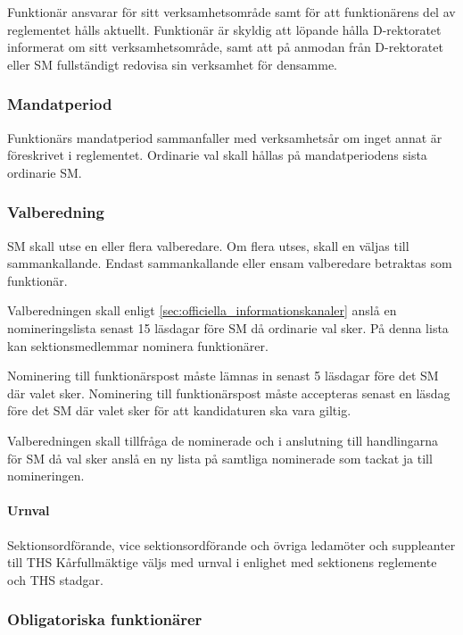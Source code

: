 \documentclass{dgovdoc}
\begin{document}
Funktionär ansvarar för sitt verksamhetsområde samt för att funktionärens del
av reglementet hålls aktuellt. Funktionär är skyldig att löpande hålla
D-rektoratet informerat om sitt verksamhetsområde, samt att på anmodan från
D-rektoratet eller SM fullständigt redovisa sin verksamhet för densamme.

\subsubsection{Mandatperiod}

Funktionärs mandatperiod sammanfaller med verksamhetsår om inget annat är
föreskrivet i reglementet. Ordinarie val skall hållas på mandatperiodens sista
ordinarie SM.

\subsubsection{Valberedning}

SM skall utse en eller flera valberedare. Om flera utses, skall en väljas till
sammankallande. Endast sammankallande eller ensam valberedare betraktas som
funktionär.

Valberedningen skall enligt \ref{sec:officiella_informationskanaler} anslå en
nomineringslista senast 15 läsdagar före SM då ordinarie val sker. På denna
lista kan sektionsmedlemmar nominera funktionärer.

Nominering till funktionärspost måste lämnas in senast 5 läsdagar före det SM
där valet sker. Nominering till funktionärspost måste accepteras senast en
läsdag före det SM där valet sker för att kandidaturen ska vara giltig.

Valberedningen skall tillfråga de nominerade och i anslutning till handlingarna
för SM då val sker anslå en ny lista på samtliga nominerade som tackat ja till
nomineringen.

\paragraph{Urnval}

Sektionsordförande, vice sektionsordförande och övriga ledamöter och
suppleanter till THS Kårfullmäktige väljs med urnval i enlighet med sektionens
reglemente och THS stadgar.

\subsubsection{Obligatoriska funktionärer}
\end{document}
